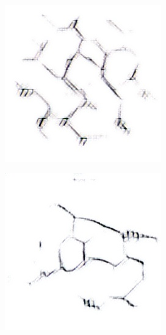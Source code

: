 \begin{figure}[H]
\centering
    \begin{subfigure}{.28\textwidth}
        \centering
        \includegraphics[width=1\linewidth]{imagenes/image_generation/clean_results/perlin_e70_a1_f2_2.jpg}
    \end{subfigure}%
    \begin{subfigure}{.28\textwidth}
        \centering
        \includegraphics[width=1\linewidth]{imagenes/image_generation/clean_results/perlin_e75_a1_f4_33.jpg}
    \end{subfigure}%


\end{figure}
